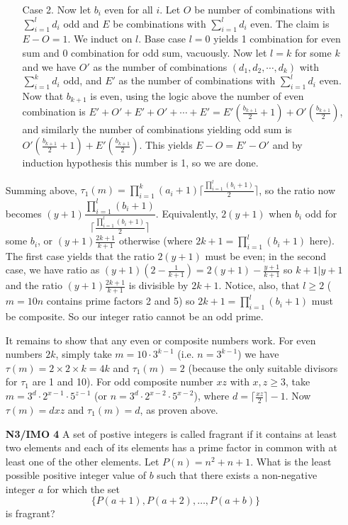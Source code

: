 \documentclass[11pt,a4paper]{article}
\begin{document}
\begin{itemize}
\begin{itemize}
\item[Case 2.] Now let $b_i$ even for all $i$. Let $O$ be number of combinations with $\displaystyle\sum_{i=1}^{l}d_i$ odd and $E$ be combinations with $\displaystyle\sum_{i=1}^{l}d_i$ even. The claim is $E-O=1$. 
We induct on $l$. 
Base case $l=0$ yields 1 combination for even sum and 0 combination for odd sum, vacuously. 
Now let $l=k$ for some $k$ and we have $O'$ as the number of combinations $(d_1, d_2, \cdots , d_k)$ with $\displaystyle\sum_{i=1}^{k}d_i$ odd, and $E'$ as the number of combinations with $\displaystyle\sum_{i=1}^{l}d_i$ even. 
Now that $b_{k+1}$ is even, using the logic above the number of even combination is 
$E'+O'+E'+O'+\cdots +E'=E'(\frac{b_{k+1}}{2}+1)+O'(\frac{b_{k+1}}{2})$, 
and similarly the number of combinations yielding odd sum is 
$O'(\frac{b_{k+1}}{2}+1)+E'(\frac{b_{k+1}}{2})$.
This yields $E-O=E'-O'$ and by induction hypothesis this number is 1, so we are done. 
\end{itemize}

Summing above, $\tau_1 (m)=\displaystyle\prod_{i=1}^{k}(a_i+1)\lceil\frac{\prod_{i=1}^{l}(b_i+1)}{2} \rceil$, 
so the ratio now becomes 
$(y+1)\dfrac{\displaystyle\prod_{i=1}^{l}(b_i+1)}{\lceil\frac{\prod_{i=1}^{l}(b_i+1)}{2} \rceil}$. 
Equivalently, $2(y+1)$ when $b_i$ odd for some $b_i$, or $(y+1)\frac{2k+1}{k+1}$ otherwise (where $2k+1=\displaystyle\prod_{i=1}^{l}(b_i+1)$ here). 
The first case yields that the ratio $2(y+1)$ must be even; in the second case, we have ratio as $(y+1)\left(2-\frac 1{k+1}\right)=2(y+1)-\frac{y+1}{k+1}$ so $k+1|y+1$ and the ratio $(y+1)\frac{2k+1}{k+1}$ is divisible by $2k+1$.  
Notice, also, that $l\ge 2$ ($m=10n$ contains prime factors 2 and 5) so $2k+1=\displaystyle\prod_{i=1}^{l}(b_i+1)$ must be composite. 
So our integer ratio cannot be an odd prime. 

It remains to show that any even or composite numbers work. 
For even numbers $2k$, simply take $m=10\cdot 3^{k-1}$ (i.e. $n=3^{k-1}$) we have $\tau(m)=2\times 2\times k=4k$ and $\tau_1(m)=2$ (because the only suitable divisors for $\tau_1$ are 1 and 10). 
For odd composite number $xz$ with $x, z\ge 3$, take $m=3^{d}\cdot 2^{x-1}\cdot 5^{z-1}$ (or $n=3^d\cdot 2^{x-2}\cdot 5^{x-2}$), where $d=\lceil \frac{xz}2\rceil -1$. Now $\tau(m)=dxz$ and  $\tau_1(m)=d$, as proven above. 


\newpage

\item[\textbf{N3/IMO 4}]
A set of postive integers is called fragrant if it contains at least two elements and each of its elements has a prime factor in common with at least one of the other elements. Let $P(n)=n^2+n+1$. What is the least possible positive integer value of $b$ such that there exists a non-negative integer $a$ for which the set $$\{P(a+1),P(a+2),\ldots,P(a+b)\}$$is fragrant?


\end{itemize}
\end{document}
